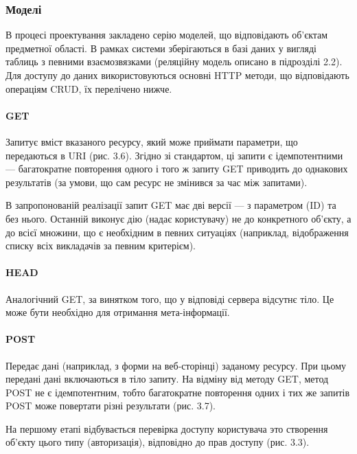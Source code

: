 
\subsubsection{Моделі}

В процесі проектування закладено серію моделей, що відповідають об’єктам предметної області. В рамках системи зберігаються в базі даних у вигляді таблиць з певними взаємозвязками (реляційну модель описано в підрозділі 2.2). Для доступу до даних використовуються основні HTTP методи, що відповідають операціям CRUD, їх перелічено нижче.

\paragraph{GET}

Запитує вміст вказаного ресурсу, який може приймати параметри, що передаються в URI (рис. 3.6). Згідно зі стандартом, ці запити є ідемпотентними — багатократне повторення одного і того ж запиту GET приводить до однакових результатів (за умови, що сам ресурс не змінився за час між запитами).

В запропонованій реалізації запит GET має дві версії — з параметром (ID) та без нього. Останній виконує дію (надає користувачу) не до конкретного об’єкту, а до всієї множини, що є необхідним в певних ситуаціях (наприклад, відображення списку всіх викладачів за певним критерієм).

\paragraph{HEAD}

Аналогічний GET, за винятком того, що у відповіді сервера відсутнє тіло. Це може бути необхідно для отримання мета-інформації.

\paragraph{POST}

Передає дані (наприклад, з форми на веб-сторінці) заданому ресурсу. При цьому передані дані включаються в тіло запиту. На відміну від методу GET, метод POST не є ідемпотентним, тобто багатократне повторення одних і тих же запитів POST може повертати різні результати (рис. 3.7).

На першому етапі відбувається перевірка доступу користувача это створення об’єкту цього типу (авторизація), відповідно до прав доступу (рис. 3.3).


